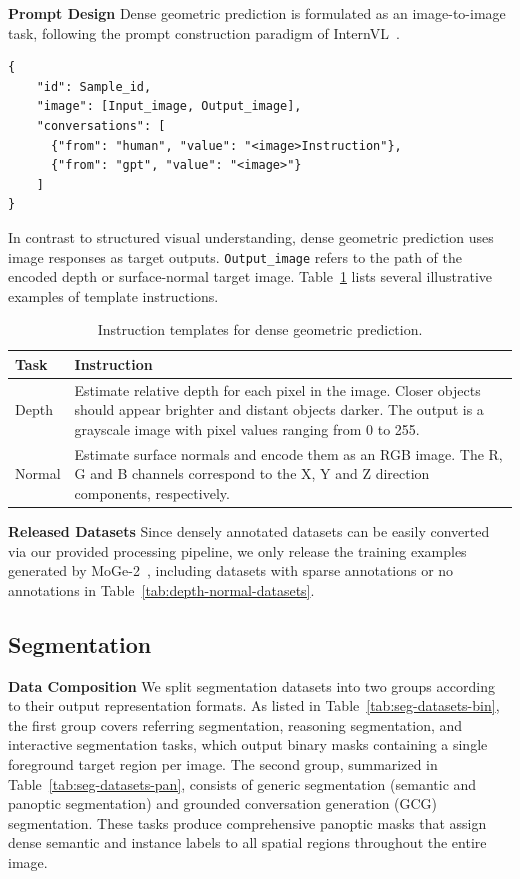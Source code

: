 \textbf{Prompt Design}
Dense geometric prediction is formulated as an image-to-image task, following the prompt construction paradigm of InternVL~\cite{chen2024internvl}.
\noindent
\begin{lstlisting}
{
    "id": Sample_id,
    "image": [Input_image, Output_image],
    "conversations": [
      {"from": "human", "value": "<image>Instruction"},
      {"from": "gpt", "value": "<image>"}
    ]
}
\end{lstlisting}
In contrast to structured visual understanding, dense geometric prediction uses image responses as target outputs.
 \texttt{Output\_image} refers to the path of the encoded depth or surface-normal target image.
Table~\ref{tab:depth-normal-prompt-templates} lists several illustrative examples of template instructions.

\begin{table}[htbp]
  \centering
  \footnotesize
  \setlength{\tabcolsep}{3pt}
  \renewcommand{\arraystretch}{0.88}
  \begin{tabular}{p{}|p{}}
    \toprule
    Task & Instruction \\
    \midrule
    Depth &
    Estimate relative depth for each pixel in the image.
    Closer objects should appear brighter and distant objects darker.
    The output is a grayscale image with pixel values ranging from 0 to 255. \\
    \midrule
    Normal &
    Estimate surface normals and encode them as an RGB image.
    The R, G and B channels correspond to the X, Y and Z direction components, respectively. \\
    \bottomrule
  \end{tabular}
  \caption{Instruction templates for dense geometric prediction.}
  \label{tab:depth-normal-prompt-templates}
\end{table}

\textbf{Released Datasets}
Since densely annotated datasets can be easily converted via our provided processing pipeline, we only release the training examples generated by MoGe-2~\cite{wang2025moge2}, including datasets with sparse annotations or no annotations in Table~\ref{tab:depth-normal-datasets}.

\subsection{Segmentation}
\textbf{Data Composition}
We split segmentation datasets into two groups according to their output representation formats.
As listed in Table~\ref{tab:seg-datasets-bin}, the first group covers referring segmentation, reasoning segmentation, and interactive segmentation tasks, which output binary masks containing a single foreground target region per image.
The second group, summarized in Table~\ref{tab:seg-datasets-pan}, consists of generic segmentation (semantic and panoptic segmentation) and grounded conversation generation (GCG) segmentation.
These tasks produce comprehensive panoptic masks that assign dense semantic and instance labels to all spatial regions throughout the entire image.

